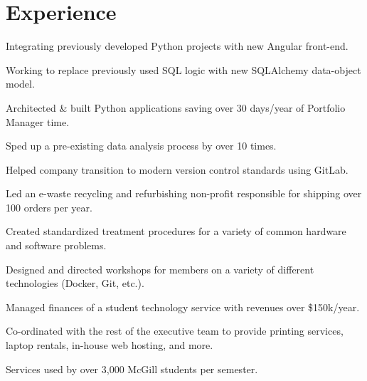 \documentclass[]{willguthrie-resume}
\begin{document}
\begin{minipage}[t]{0.66\textwidth}

	\vspace{\topsep}
	\section{Experience}

	\vspace{\topsep} %
	\begin{tightemize}
		\item Integrating previously developed Python projects with new Angular front-end.
		\item Working to replace previously used SQL logic with new SQLAlchemy data-object model.
	\end{tightemize}

	\begin{tightemize}
		\item Architected \& built Python applications saving over 30 days/year of Portfolio Manager time.
		\item Sped up a pre-existing data analysis process by over 10 times.
		\item Helped company transition to modern version control standards using GitLab.
	\end{tightemize}

	\begin{tightemize}
		\item Led an e-waste recycling and refurbishing non-profit responsible for shipping over 100 orders per year.
		\item Created standardized treatment procedures for a variety of common hardware and software problems.
		\item Designed and directed workshops for members on a variety of different technologies (Docker, Git, etc.).
	\end{tightemize}

	\begin{tightemize}
		\item Managed finances of a student technology service with revenues over \$150k/year.
		\item Co-ordinated with the rest of the executive team to provide printing services, laptop rentals, in-house web hosting, and more.
		\item Services used by over 3,000 McGill students per semester.
	\end{tightemize}


\end{minipage}
\end{document}
